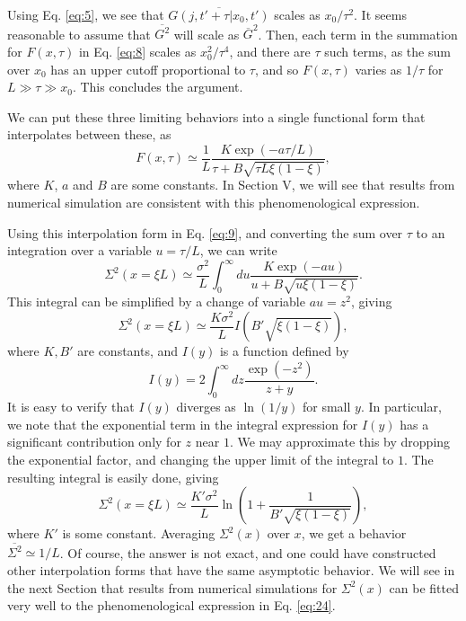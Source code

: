 \documentclass[11pt,a4paper]{book}
\begin{document}
Using Eq. \eqref{eq:5}, we see that $ \overline{G(j,t'+\tau|x_0,t')}$ scales as $ 
x_0/\tau^2 $.  It seems reasonable to assume that $\overline{G^2}$ will 
scale as $\overline{G}^2$. Then, each term in the 
summation for $F(x,\tau)$ in Eq. \eqref{eq:8} scales as 
$x_0^2/\tau^4$, and there are $\tau$ such terms, as the  sum over $x_0$ has an 
upper cutoff proportional to $\tau$, and so $F(x,\tau)$ varies as 
$1/\tau$ for $ L \gg \tau \gg x_0$. This concludes the argument.

We can put these three limiting behaviors into a single functional form 
that interpolates between these, as
\begin{equation}
  F(x,\tau) \simeq \frac{1}{L} \frac{K \exp( - a \tau/L)}{\tau + B \sqrt{\tau L \xi (1 
-\xi)}},
\end{equation}
where $K$, $a$ and $B$ are some constants.
In Section V, we will see that results from numerical simulation 
are consistent with this phenomenological 
expression.  
 
Using this interpolation form in Eq. \eqref{eq:9}, and converting the sum 
over $\tau$ to an integration over a variable $u = \tau/L$,  we can write
\begin{equation}
\Sigma^2(x = \xi L) \simeq \frac{\sigma^2}{L} \int_0^{\infty}du \frac{ K 
\exp( - a u)}{u + B 
\sqrt{ u \xi ( 1 - \xi)}}.
\end{equation}
This integral can be simplified by a change of variable $ au = z^2$, 
giving
\begin{equation}
\Sigma^2(x = \xi L) \simeq \frac{ K \sigma^2}{L} I\left(B'\sqrt{\xi(1 - \xi)}\right),
\end{equation}
where $K, B'$ are  constants, and $I(y)$ is a function defined by
\begin{equation}
I(y) = 2\int_0^{\infty} dz \frac{ \exp( - z^2)}{ z + y}.
\end{equation}
It is easy to verify that $I(y)$ diverges as $\ln ( 1/y)$ for small 
$y$.  In 
particular, we note that the exponential term in the integral 
expression for $I(y)$ has a significant contribution only for $z$ near 
$1$.  We may approximate this by dropping the exponential factor, and 
changing the upper limit of the integral to $1$.  The resulting integral 
is easily done, giving
\begin{equation}
  \label{eq:24}
\Sigma^2(x=\xi L) \simeq \frac{ K' \sigma^2}{ L} \ln \left( 1 + 
\frac{1}{B'\sqrt{\xi(1 -\xi)}}\right),
\end{equation} 
where $K'$ is some constant.
Averaging $\Sigma^2(x)$ over $x$, we get a behavior $ 
\overline{\Sigma^2} \simeq 1/L$. Of course, the answer is not exact, and one could have constructed 
other interpolation forms that have the same asymptotic behavior.
We will see in the next Section that results from numerical simulations
for $\Sigma^2(x)$ can be fitted very well to the phenomenological
expression in Eq. \eqref{eq:24}.
\end{document}
